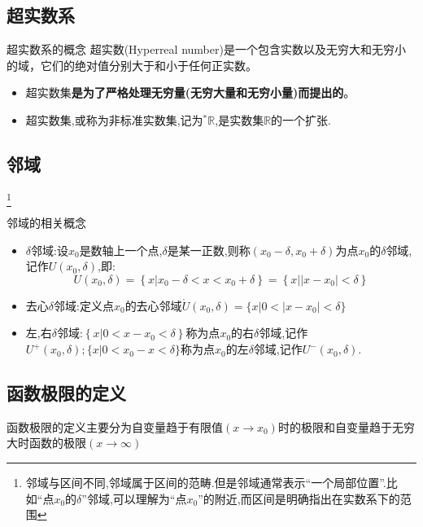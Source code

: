 \documentclass[12pt, a4paper, oneside, UTF8]{ctexbook}
\begin{document}
\begin{sloppypar}
    \subsection{超实数系}
    \begin{defn}{超实数系的概念}{}
        超实数(Hyperreal number)是一个包含实数以及无穷大和无穷小的域，它们的绝对值分别大于和小于任何正实数。
    \end{defn}
    \begin{criterion}{}{}
        \begin{itemize}
            \item 超实数集\textbf{是为了严格处理无穷量(无穷大量和无穷小量)而提出的}。
            \item 超实数集,或称为非标准实数集,记为$^{*}\mathbb{R}$,是实数集$\mathbb{R}$的一个扩张.
        \end{itemize}
    \end{criterion}
    \subsection{邻域}\footnote{邻域与区间不同,邻域属于区间的范畴.但是邻域通常表示“一个局部位置”.比如“点$x_0$的$\delta$”邻域,可以理解为“点$x_0$”的附近,而区间是明确指出在实数系下的范围}
    \begin{defn}{邻域的相关概念}{}
        \begin{itemize}
            \item $\delta$邻域:设$x_0$是数轴上一个点,$\delta$是某一正数,则称$(x_{0}-\delta,x_{0}+\delta)$为点$x_0$的$\delta$邻域,记作$U(x_{0},\delta)$,即:
                  $$
                      U(x_{0},\delta)=\left\{x|x_{0}-\delta<x<x_{0}+\delta\right\}=\left\{\left.x\right|\left|\left.x-x_{0}\right|<\delta\right\}\right.
                  $$
            \item 去心$\delta$邻域:定义点$x_0$的去心邻域$\mathring{U}(x_{0},\delta)=\bigl\{x|0<\bigl|x-x_{0}\bigr|<\delta\bigr\}$
            \item 左,右$\delta$邻域:$\left\{x|0<x-x_{0}<\delta\right\}$称为点$x_0$的右$\delta$邻域,记作$U^{+}(x_{0},\delta);\{x|0<x_{0}-x<\delta\}$称为点$x_0$的左$\delta$邻域,记作$U^{-}(x_{0},\delta).$
        \end{itemize}
    \end{defn}
    \subsection{函数极限的定义}
    函数极限的定义主要分为自变量趋于有限值$(x \to x_0)$时的极限和自变量趋于无穷大时函数的极限$(x \to \infty)$

\end{sloppypar}
\end{document}
